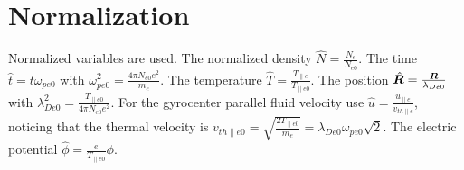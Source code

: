 \documentclass[final]{jpp}
\begin{document}
\section{Normalization}
Normalized variables are used. The normalized density $ \hat{N}=\frac{N_e}{N_{e0}} $. The time $ \hat{t}=t \omega_{pe0} $ with $   \omega_{pe0}^2=\frac{4\pi N_{e0}e^2}{m_e} $. %
The temperature $ \hat{T}=\frac{T_{\parallel e}}{T_{\parallel e0}} $. The position $ \hat{\bm{R}}=\frac{\bm{R}}{\lambda_{De0}} $ with $ \lambda_{De0}^2=\frac{T_{\parallel e0}}{4\pi N_{e0}e^2} $.
For the gyrocenter parallel fluid velocity use $ \hat{u}=\frac{u_{\parallel e}}{v_{th \parallel e}} $, noticing that the thermal velocity is $ v_{th \parallel e 0 }= \sqrt{\frac{2 T_{\parallel e0}}{m_e}} =  \lambda_{De0}\omega_{pe0}\sqrt{2 }$. %
The electric potential $ \hat{\phi}=\frac{e}{T_{\parallel e0}}\phi $. 
\end{document}
